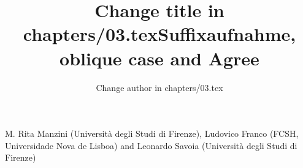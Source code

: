 \documentclass[output=paper]{langsci/langscibook}
\author{Change author in chapters/03.tex}
\title{Change title in chapters/03.tex}
\begin{document}
\title{Suffixaufnahme, oblique case and Agree}

 

 

 

 

 

 

 

 

 

 

 
\begin{styleSfondomedioiColorexxi}
M. Rita Manzini (Università degli Studi di Firenze), Ludovico Franco (FCSH, Universidade Nova de Lisboa) and Leonardo Savoia (Università degli Studi di Firenze)
\end{styleSfondomedioiColorexxi}
\end{document}
